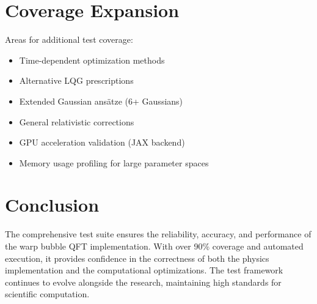 \documentclass[12pt]{article}
\begin{document}
\section{Coverage Expansion}

Areas for additional test coverage:
\begin{itemize}
\item Time-dependent optimization methods
\item Alternative LQG prescriptions
\item Extended Gaussian ansätze (6+ Gaussians)
\item General relativistic corrections
\item GPU acceleration validation (JAX backend)
\item Memory usage profiling for large parameter spaces
\end{itemize}

\section{Conclusion}

The comprehensive test suite ensures the reliability, accuracy, and performance of the warp bubble QFT implementation. With over 90\% coverage and automated execution, it provides confidence in the correctness of both the physics implementation and the computational optimizations. The test framework continues to evolve alongside the research, maintaining high standards for scientific computation.
\end{document}
